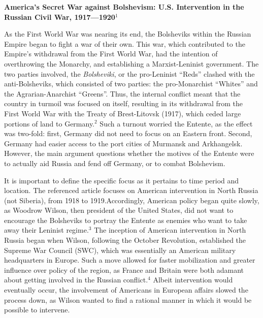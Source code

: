 



\begin{center}

  \textbf{America's Secret War against Bolshevism: U.S. Intervention in the Russian Civil War, 1917—1920}$^1$

\end{center}

\begin{justify}

  \hspace{.5in} As the First World War was nearing its end, the Bolsheviks within the Russian Empire began to fight a war of their own. This war, which contributed to the Empire's withdrawal from the First World War, had the intention of overthrowing the Monarchy, and establishing a Marxist-Leninist government. The two parties involved, the \textit{Bolsheviki}, or the pro-Leninist ``Reds'' clashed with the anti-Bolsheviks, which consisted of two parties: the pro-Monarchist ``Whites'' and the Agrarian-Anarchist ``Greens''. Thus, the internal conflict meant that the country in turmoil was focused on itself, resulting in its withdrawal from the First World War with the Treaty of Brest-Litovsk (1917), which ceded large portions of land to Germany.$^2$ Such a turnout worried the Entente, as the effect was two-fold: first, Germany did not need to focus on an Eastern front. Second, Germany had easier access to the port cities of Murmansk and Arkhangelsk. However, the main argument questions whether the motives of the Entente were to actually aid Russia and fend off Germany, or to combat Bolshevism.

  \hspace{.5in} It is important to define the specific focus as it pertains to time period and location. The referenced article focuses on American intervention in North Russia (not Siberia), from 1918 to 1919.Accordingly, American policy began quite slowly, as Woodrow Wilson, then president of the United States, did not want to encourage the Bolsheviks to portray the Entente as enemies who want to take away their Leninist regime.$^3$ The inception of American intervention in North Russia began when Wilson, following the October Revolution, established the Supreme War Council (SWC), which was essentially an American military headquarters in Europe. Such a move allowed for faster mobilization and greater influence over policy of the region, as France and Britain were both adamant about getting involved in the Russian conflict.$^4$ Albeit intervention would eventually occur, the involvement of Americans in European affairs slowed the process down, as Wilson wanted to find a rational manner in which it would be possible to intervene.


\end{justify}
